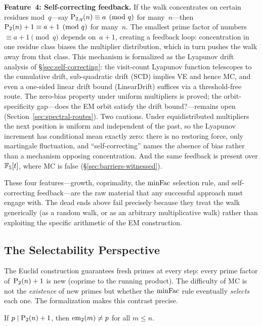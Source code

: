 \medskip\noindent\textbf{Feature~4: Self-correcting feedback.}\enspace
If the walk concentrates on certain residues mod~$q$---say
$\mathrm{P}_{2,q}(n) \equiv a \pmod{q}$ for many~$n$---then
$\mathrm{P}_{2}(n)+1 \equiv a+1 \pmod{q}$ for many~$n$.  The smallest prime
factor of numbers $\equiv a+1 \pmod{q}$ depends on~$a+1$, creating a
feedback loop: concentration in one residue class biases the
multiplier distribution, which in turn pushes the walk away from that
class.  This mechanism is formalized as the Lyapunov drift analysis
of \S\ref{sec:self-correcting}: the visit-count Lyapunov function
telescopes to the cumulative drift, sub-quadratic drift (SCD) implies
VE and hence MC, and even a one-sided linear drift bound (LinearDrift)
suffices via a threshold-free route.  The zero-bias property under
uniform multipliers is proved; the orbit-specificity gap---does the
EM orbit satisfy the drift bound?---remains open
(Section~\ref{sec:spectral-routes}).  Two cautions.  Under
equidistributed multipliers the next position is uniform and
independent of the past, so the Lyapunov increment has conditional mean
exactly zero: there is no restoring force, only martingale fluctuation,
and ``self-correcting'' names the absence of bias rather than a
mechanism opposing concentration.  And the same feedback is present
over $\mathbb{F}_5[t]$, where MC is false (\S\ref{sec:barriers-witnessed}).

\medskip
These four features---growth, coprimality, the $\mathrm{minFac}$ selection
rule, and self-correcting feedback---are the raw material that any
successful approach must engage with.  The dead ends above fail
precisely because they treat the walk generically (as a random walk,
or as an arbitrary multiplicative walk) rather than exploiting the
specific arithmetic of the EM construction.


\subsection{The Selectability Perspective}
\label{sec:selectability}

The Euclid construction guarantees fresh primes at every step: every
prime factor of~$\mathrm{P}_{2}(n)+1$ is new (coprime to the running product).
The difficulty of MC is not the \emph{existence} of new primes but
whether the $\mathrm{minFac}$ rule eventually \emph{selects} each one.  The
formalization makes this contrast precise.

\begin{theorem}
\label{thm:divisor-fresh}
If $p \mid \mathrm{P}_{2}(n)+1$, then $\mathrm{em}_{2}(m) \neq p$ for all $m \leq n$.
\end{theorem}

